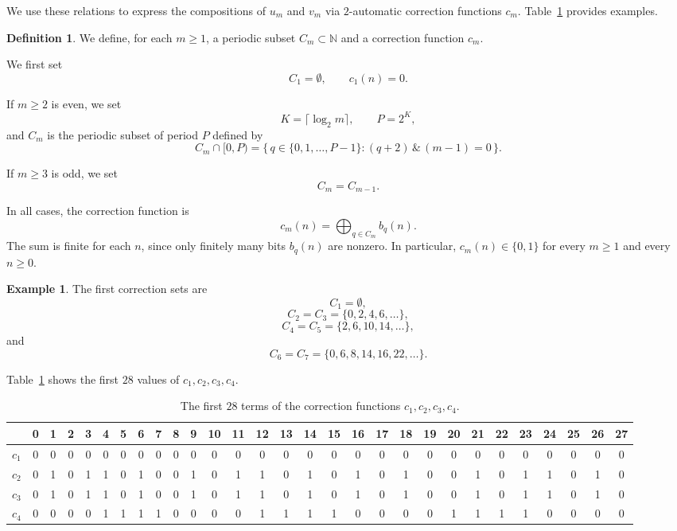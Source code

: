 \documentclass[12pt,reqno]{article}
\newcommand{\N}{\mathbb{N}}
\theoremstyle{plain}
\theoremstyle{definition}
\newtheorem{definition}[theorem]{Definition}
\newtheorem{example}[theorem]{Example}
\begin{document}
We use these relations to express the compositions of $u_m$ and $v_m$ via $2$-automatic correction functions $c_m$. Table~\ref{tab:correction} provides examples.

\begin{definition}
We define, for each $m\ge 1$, a periodic subset $C_m \subset \N$ and a correction function $c_m$.

We first set
\[
  C_1=\emptyset,
  \qquad
  c_1(n)=0.
\]

If $m\ge 2$ is even, we set
\[
  K=\lceil \log_2 m\rceil, \qquad P=2^K,
\]
and $C_m$ is the periodic subset of period $P$ defined by
\[
  C_m\cap[0,P)
  =
  \{\,q\in\{0,1,\dots,P-1\} : (q+2)\,\&\,(m-1)=0\,\}.
\]

If $m\ge 3$ is odd, we set
\[
  C_m=C_{m-1}.
\]

In all cases, the correction function is
\[
  c_m(n)=\bigoplus_{q\in C_m} b_q(n).
\]
The sum is finite for each $n$, since only finitely many bits $b_q(n)$ are nonzero. In particular, $c_m(n) \in \{0, 1\}$ for every $m \ge 1$ and every $n \ge 0$.
\end{definition}

\begin{example}
The first correction sets are
\[
  C_1=\emptyset,
\]
\[
  C_2=C_3=\{0,2,4,6,\dots\},
\]
\[
  C_4=C_5=\{2,6,10,14,\dots\},
\]
and
\[
  C_6=C_7=\{0,6,8,14,16,22,\dots\}.
\]
\end{example}

Table~\ref{tab:correction} shows the first $28$ values of $c_1, c_2, c_3, c_4$.

\begin{table}[H]
\centering
\small
\setlength{\tabcolsep}{3pt}
\begin{tabular}{c|cccccccccccccccccccccccccccc}
 & 0 & 1 & 2 & 3 & 4 & 5 & 6 & 7 & 8 & 9 & 10 & 11 & 12 & 13 & 14 & 15 & 16 & 17 & 18 & 19 & 20 & 21 & 22 & 23 & 24 & 25 & 26 & 27 \\
\hline
$c_{1}$ & 0 & 0 & 0 & 0 & 0 & 0 & 0 & 0 & 0 & 0 & 0 & 0 & 0 & 0 & 0 & 0 & 0 & 0 & 0 & 0 & 0 & 0 & 0 & 0 & 0 & 0 & 0 & 0 \\
$c_{2}$ & 0 & 1 & 0 & 1 & 1 & 0 & 1 & 0 & 0 & 1 & 0 & 1 & 1 & 0 & 1 & 0 & 1 & 0 & 1 & 0 & 0 & 1 & 0 & 1 & 1 & 0 & 1 & 0 \\
$c_{3}$ & 0 & 1 & 0 & 1 & 1 & 0 & 1 & 0 & 0 & 1 & 0 & 1 & 1 & 0 & 1 & 0 & 1 & 0 & 1 & 0 & 0 & 1 & 0 & 1 & 1 & 0 & 1 & 0 \\
$c_{4}$ & 0 & 0 & 0 & 0 & 1 & 1 & 1 & 1 & 0 & 0 & 0 & 0 & 1 & 1 & 1 & 1 & 0 & 0 & 0 & 0 & 1 & 1 & 1 & 1 & 0 & 0 & 0 & 0 \\
\end{tabular}
\caption{The first $28$ terms of the correction functions $c_1, c_2, c_3, c_4$.}
\label{tab:correction}
\end{table}
\end{document}
